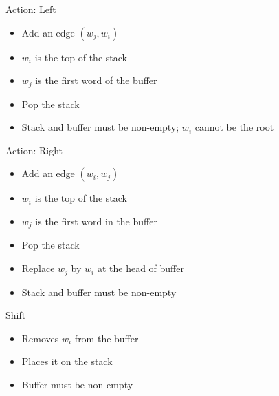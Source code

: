 \documentclass[compress]{beamer}
\begin{document}
\begin{frame}{Action: Left}

  \begin{itemize}
    \item Add an edge $(w_j, w_i)$
    \item $w_i$ is the top of the stack
    \item $w_j$ is the first word of the buffer
    \item Pop the stack
      \pause
    \item Stack and buffer must be non-empty; $w_i$ cannot be the root
  \end{itemize}

\end{frame}

\begin{frame}{Action: Right}

  \begin{itemize}
    \item Add an edge $(w_i, w_j)$
    \item $w_i$ is the top of the stack
    \item $w_j$ is the first word in the buffer
    \item Pop the stack
    \item Replace $w_j$ by $w_i$ at the head of buffer
      \pause
    \item Stack and buffer must be non-empty
  \end{itemize}

\end{frame}

\begin{frame}{Shift}

  \begin{itemize}
    \item Removes $w_i$ from the buffer
    \item Places it on the stack
      \pause
    \item Buffer must be non-empty
  \end{itemize}

\end{frame}
\end{document}
